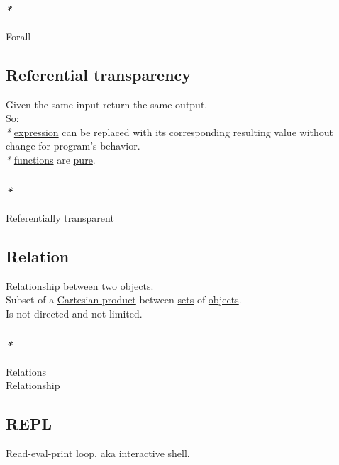 \documentclass[11pt]{article}
\begin{document}
\paragraph{\emph{*}}
\label{sec:orga309686}

\label{orga0ddc78}Forall\\

\subsection{\label{orgbb32bbc}Referential transparency}
\label{sec:orga590713}
Given the same input return the same output.\\
So:\\
\emph{*} \hyperref[org9021dd7]{expression} can be replaced with its corresponding resulting value without change for program's behavior.\\
\emph{*} \hyperref[orgaa8fb87]{functions} are \hyperref[org1bf8e16]{pure}.\\

\subsubsection{\emph{*}}
\label{sec:org2b53c0f}

\label{orgd5ad3f9}Referentially transparent\\

\subsection{\label{orga5705a9}Relation}
\label{sec:org3ee0f22}
\hyperref[orge5b5c78]{Relationship} between two \hyperref[org363acc2]{objects}.\\
Subset of a \hyperref[orgbaf1ac4]{Cartesian product} between \hyperref[org58ec608]{sets} of \hyperref[org363acc2]{objects}.\\
Is not directed and not limited.\\

\subsubsection{\emph{*}}
\label{sec:org666ebbd}

\label{org711476e}Relations\\
\label{orge5b5c78}Relationship\\

\subsection{\label{orgc50aad9}REPL}
\label{sec:org1339d7a}
Read-eval-print loop, aka interactive shell.\\
\end{document}
